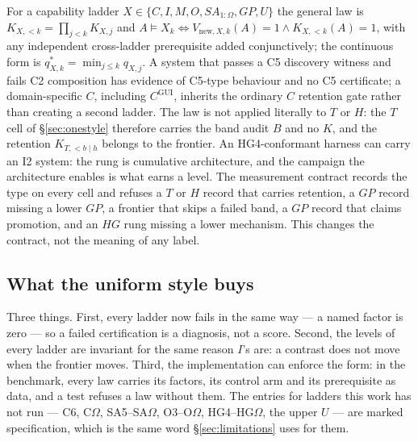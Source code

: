 \documentclass[11pt]{article}
\theoremstyle{definition}
\newcommand{\Om}{\ensuremath{\Omega}}
\begin{document}
For a capability ladder $X \in \{C, I, M, O, SA_{1:\Omega}, GP, U\}$ the general law is $K_{X,<k} = \prod_{j<k} K_{X,j}$ and $A \models X_k \iff V_{\mathrm{new},X,k}(A) = 1 \wedge K_{X,<k}(A) = 1$, with any independent cross-ladder prerequisite added conjunctively; the continuous form is $q^{*}_{X,k} = \min_{j \le k} q_{X,j}$. A system that passes a C5 discovery witness and fails C2 composition has evidence of C5-type behaviour and no C5 certificate; a domain-specific $C$, including $C^{\mathrm{GUI}}$, inherits the ordinary $C$ retention gate rather than creating a second ladder. The law is not applied literally to $T$ or $H$: the $T$ cell of \S\ref{sec:onestyle} therefore carries the band audit $B$ and no $K$, and the retention $K_{T,<b\mid h}$ belongs to the frontier. An HG4-conformant harness can carry an I2 system: the rung is cumulative architecture, and the campaign the architecture enables is what earns a level. The measurement contract records the type on every cell and refuses a $T$ or $H$ record that carries retention, a $GP$ record missing a lower $GP$, a frontier that skips a failed band, a $GP$ record that claims promotion, and an $HG$ rung missing a lower mechanism. This changes the contract, not the meaning of any label.

\subsection{What the uniform style buys}
Three things. First, every ladder now fails in the same way --- a named factor is zero --- so a failed certification is a diagnosis, not a score. Second, the levels of every ladder are invariant for the same reason $I$'s are: a contrast does not move when the frontier moves. Third, the implementation can enforce the form: in the benchmark, every law carries its factors, its control arm and its prerequisite as data, and a test refuses a law without them. The entries for ladders this work has not run --- C6, C\Om{}, SA5--SA\Om{}, O3--O\Om{}, HG4--HG\Om{}, the upper $U$ --- are marked specification, which is the same word \S\ref{sec:limitations} uses for them.
\end{document}
